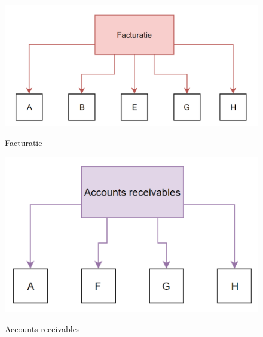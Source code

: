 \documentclass[aspectratio=169]{beamer}
\begin{document}
\begin{frame}
\begin{figure}
	\caption{Facturatie}
	\includegraphics[height=.8\textheight]{img/facturatie.png}
	\label{img:facturatie}
\end{figure}
\end{frame}

\begin{frame}
\begin{figure}
	\caption{Accounts receivables}
	\includegraphics[height=.8\textheight]{img/accountreceivables.png}
	\label{img:accounts_receivables}
\end{figure}
\end{frame}
\end{document}
